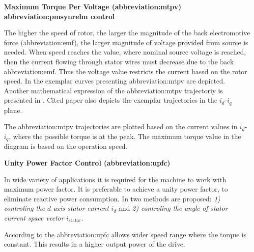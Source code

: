 \documentclass[a4paper, twoside, 11pt]{article}
\begin{document}
            \vspace*{1.5cm}
             \hspace*{-\parindent} \textbf{Maximum Torque Per Voltage (\gls{abbreviation:mtpv}) \gls{abbreviation:pmsynrelm} control}\par
                \hspace*{\parindent} The higher the speed of rotor, the larger the magnitude of the back electromotive force (\gls{abbreviation:emf}), the larger magnitude of voltage provided from source is needed. When speed reaches the value, where nominal source voltage is reached, then the current flowing through stator wires must decrease due to the back \gls{abbreviation:emf}. Thus the voltage value restricts the current based on the rotor speed. In \cite{sanz-analitical-maximum-torque-per-volt-control-strategu-of-an-interior-permanent-magnet-synchronous-motor-with-very-low-battery-voltage} the exemplar curves presenting \gls{abbreviation:mtpv} are depicted. Another mathematical expression of the \gls{abbreviation:mtpv} trajectoriy is presented in \cite{fletcher-operation-along-the-maximum-torque-per-voltage-trajectory-in-a-direct-torque-and-flux-controlled-interior-permament-magnet-synchronous-motor}. Cited paper also depicts the exemplar trajectories in the $i_d$-$i_q$ plane.
                \par
                The \gls{abbreviation:mtpv} trajectories are plotted based on the current values in $i_d$-$i_q$, where the possible torque is at the peak. The maximum torque value in the diagram is based on the operation speed.


            \vspace*{1.5cm}
             \hspace*{-\parindent} \textbf{Unity Power Factor Control (\gls{abbreviation:upfc})}\par
             \hspace*{\parindent} In wide variety of applications it is required for the machine to work with maximum power factor. It is preferable to achieve a unity power factor, to eliminate reactive power consumption. In \cite{moussa-unity-power-factor-control-of-permanent-magnet-motor-drive-system} two methods are proposed: \textit{1) controling the $d$-axis stator current $i_d$} and \textit{2) controling the angle of stator current space vector $i_\text{stator}$}.\par
             According to \cite{moussa-unity-power-factor-control-of-permanent-magnet-motor-drive-system} the \gls{abbreviation:upfc} allows wider speed range where the torque is constant. This results in a higher output power of the drive.\par
\end{document}
